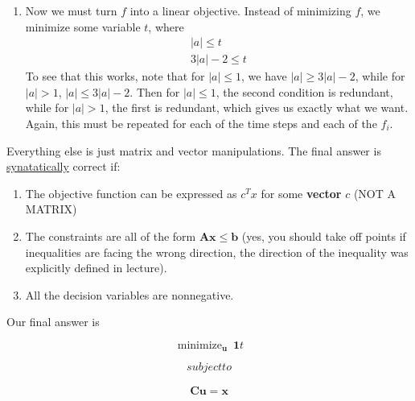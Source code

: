 \documentclass{article}
\DeclareMathOperator*{\minimize}{minimize}
\begin{document}
\begin{enumerate}
\begin{center}
    \end{center}
    \item Now we must turn $f$ into a linear objective. Instead of minimizing $f$, we minimize some variable $t$, where \begin{align*}
        |a| \le t \\
        3|a| - 2 \le t
    \end{align*}
To see that this works, note that for \( |a| \leq 1 \), we have \( |a| \geq 3|a| - 2 \),
while for \( |a| > 1 \), \( |a| \le 3|a| - 2 \). Then for \( |a| \le 1 \), the second condition
is redundant, while for \( |a| > 1 \), the first is redundant, which gives us
exactly what we want. Again, this must be repeated for each of the time steps and each of the $f_{i}$.

\end{enumerate}

\vspace{2mm}
Everything else is just matrix and vector manipulations. The final answer is \underline{synatatically} correct if:
\begin{enumerate}[label = \alph*.]
    \item The objective function can be expressed as $c^{T}x$ for some \textbf{vector} $c$ (NOT A MATRIX)
    \item The constraints are all of the form $\bm{A}\bm{x} \le \bm{b}$ (yes, you should take off points if inequalities are facing the wrong direction, the direction of the inequality was explicitly defined in lecture).
    \item All the decision variables are nonnegative.
\end{enumerate}

Our final answer is 

$$\minimize_{\bm{u}}\ \bm{1}t$$

$$subject to$$

\begin{align*}
    \bm{C}\bm{u} = \bm{x}
\end{align*}

\end{document}
